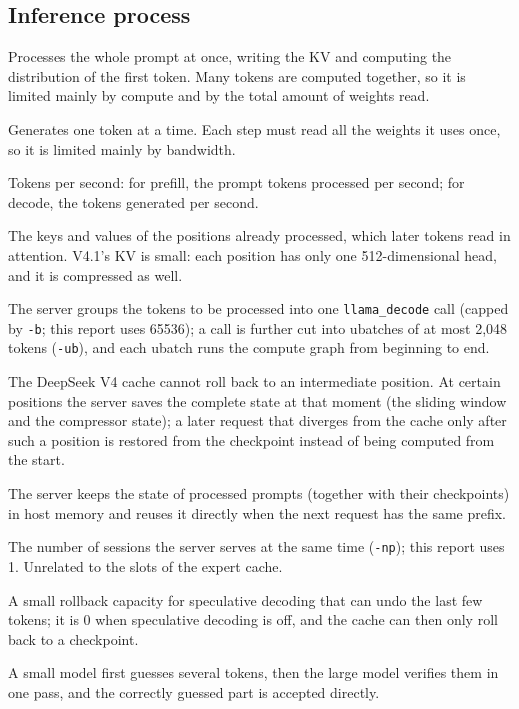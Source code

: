 \documentclass[11pt,a4paper]{article}
\newcommand{\code}[1]{\texttt{#1}}
\begin{document}
\subsection*{Inference process}
\begin{description}\small
  \item[Prefill] Processes the whole prompt at once, writing the KV and computing the distribution of the first token. Many tokens are computed together, so it is limited mainly by compute and by the total amount of weights read.
  \item[Decode] Generates one token at a time. Each step must read all the weights it uses once, so it is limited mainly by bandwidth.
  \item[tok/s] Tokens per second: for prefill, the prompt tokens processed per second; for decode, the tokens generated per second.
  \item[KV cache] The keys and values of the positions already processed, which later tokens read in attention. V4.1's KV is small: each position has only one 512-dimensional head, and it is compressed as well.
  \item[llama\_decode call, ubatch] The server groups the tokens to be processed into one \code{llama\_decode} call (capped by \code{-b}; this report uses 65536); a call is further cut into ubatches of at most 2,048 tokens (\code{-ub}), and each ubatch runs the compute graph from beginning to end.
  \item[Checkpoint] The DeepSeek V4 cache cannot roll back to an intermediate position. At certain positions the server saves the complete state at that moment (the sliding window and the compressor state); a later request that diverges from the cache only after such a position is restored from the checkpoint instead of being computed from the start.
  \item[Prompt cache] The server keeps the state of processed prompts (together with their checkpoints) in host memory and reuses it directly when the next request has the same prefix.
  \item[Server slot] The number of sessions the server serves at the same time (\code{-np}); this report uses 1. Unrelated to the slots of the expert cache.
  \item[Rollback ring (n\_rs\_seq)] A small rollback capacity for speculative decoding that can undo the last few tokens; it is 0 when speculative decoding is off, and the cache can then only roll back to a checkpoint.
  \item[Speculative decoding] A small model first guesses several tokens, then the large model verifies them in one pass, and the correctly guessed part is accepted directly.

\end{description}
\end{document}
